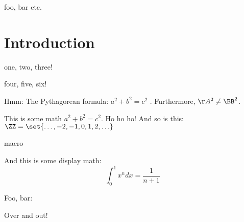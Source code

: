 
foo, bar
etc.




\newcommand{\DT}{{\mathbb S}}

\section{Introduction}

one, two, three!

four, five, six!

\begin{theorem}
Hmm: The Pythagorean formula: $a^2 + b^2 = c^2$
\yuuk {}.  Furthermore, $\AA^2 \ne \BB^2$.
\end{theorem}

This is some math $a^2 + b^2 = c^2$.  Ho ho ho!
And so is this: $\ZZ = \set{\ldots, -2, -1, 0, 1, 2, \ldots}$

macro 

And this is some display math: \[ \int_0^1 x^n dx = \frac{1}{n+1} \]

Foo, bar:

Over and out!


